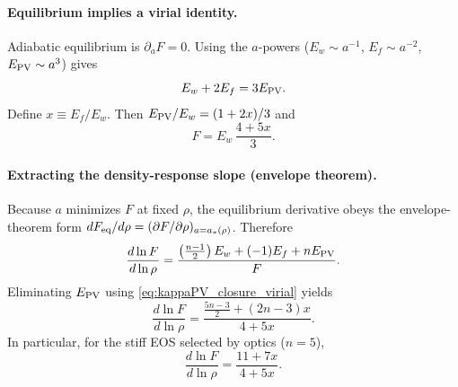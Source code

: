 \documentclass[11pt]{article}
\begin{document}
\paragraph{Equilibrium implies a virial identity.}
Adiabatic equilibrium is \(\partial_a F=0\). Using the \(a\)-powers
(\(E_w\sim a^{-1}\), \(E_f\sim a^{-2}\), \(E_{\rm PV}\sim a^{3}\)) gives
\begin{equation}
E_w+2E_f = 3E_{\rm PV}.
\label{eq:kappaPV_closure_virial}
\end{equation}
Define \(x\equiv E_f/E_w\). Then \(E_{\rm PV}/E_w=(1+2x)/3\) and
\begin{equation}
F = E_w\,\frac{4+5x}{3}.
\label{eq:kappaPV_closure_F_in_x}
\end{equation}

\paragraph{Extracting the density-response slope (envelope theorem).}
Because \(a\) minimizes \(F\) at fixed \(\rho\), the equilibrium derivative obeys the envelope-theorem form
\(dF_{\rm eq}/d\rho = (\partial F/\partial\rho)_{a=a_*(\rho)}\). Therefore
\begin{equation}
\frac{d\ln F}{d\ln\rho}
=
\frac{\left(\frac{n-1}{2}\right)E_w + (-1)E_f + nE_{\rm PV}}{F}.
\label{eq:kappaPV_closure_dlnF_general}
\end{equation}
Eliminating \(E_{\rm PV}\) using \eqref{eq:kappaPV_closure_virial} yields
\begin{equation}
\frac{d\ln F}{d\ln\rho}
=
\frac{\frac{5n-3}{2} + (2n-3)x}{4+5x}.
\label{eq:kappaPV_closure_dlnF_in_x_general_n}
\end{equation}
In particular, for the stiff EOS selected by optics (\(n=5\)),
\begin{equation}
\frac{d\ln F}{d\ln\rho}
=
\frac{11+7x}{4+5x}.
\label{eq:kappaPV_closure_dlnF_in_x_n5}
\end{equation}
\end{document}
